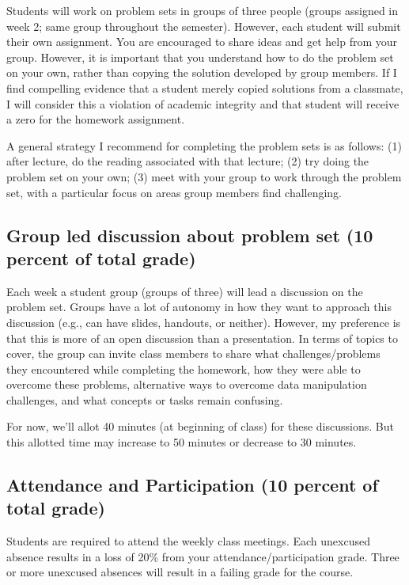 \documentclass[11pt,]{article}
\begin{document}
Students will work on problem sets in groups of three people (groups
assigned in week 2; same group throughout the semester). However, each
student will submit their own assignment. You are encouraged to share
ideas and get help from your group. However, it is important that you
understand how to do the problem set on your own, rather than copying
the solution developed by group members. If I find compelling evidence
that a student merely copied solutions from a classmate, I will consider
this a violation of academic integrity and that student will receive a
zero for the homework assignment.

A general strategy I recommend for completing the problem sets is as
follows: (1) after lecture, do the reading associated with that lecture;
(2) try doing the problem set on your own; (3) meet with your group to
work through the problem set, with a particular focus on areas group
members find challenging.

\subsection{Group led discussion about problem set (10 percent of total
grade)}\label{group-led-discussion-about-problem-set-10-percent-of-total-grade}

Each week a student group (groups of three) will lead a discussion on
the problem set. Groups have a lot of autonomy in how they want to
approach this discussion (e.g., can have slides, handouts, or neither).
However, my preference is that this is more of an open discussion than a
presentation. In terms of topics to cover, the group can invite class
members to share what challenges/problems they encountered while
completing the homework, how they were able to overcome these problems,
alternative ways to overcome data manipulation challenges, and what
concepts or tasks remain confusing.

For now, we'll allot 40 minutes (at beginning of class) for these
discussions. But this allotted time may increase to 50 minutes or
decrease to 30 minutes.

\subsection{Attendance and Participation (10 percent of total
grade)}\label{attendance-and-participation-10-percent-of-total-grade}

Students are required to attend the weekly class meetings. Each
unexcused absence results in a loss of 20\% from your
attendance/participation grade. Three or more unexcused absences will
result in a failing grade for the course.
\end{document}
